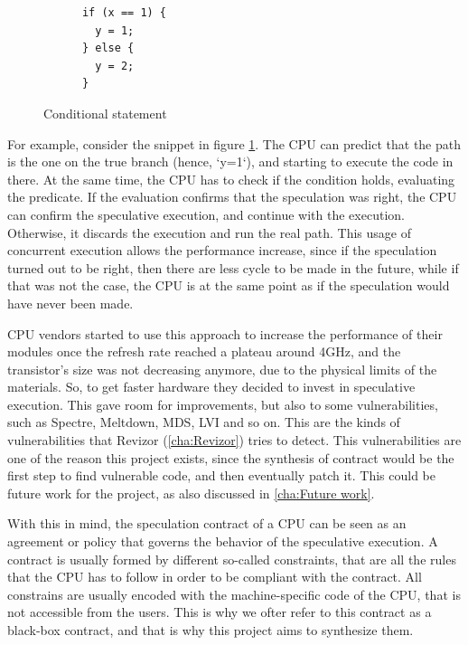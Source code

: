 \begin{figure}
  \centering
  \begin{varwidth}
    {\linewidth} \begin{verbatim}
      if (x == 1) {
        y = 1;
      } else {
        y = 2;
      }
          \end{verbatim}
  \end{varwidth}
  \label{fig:snip1}
  \caption{Conditional statement}
\end{figure}

For example, consider the snippet in figure \ref{fig:snip1}. The CPU can predict
that the path is the one on the true branch (hence, `y=1`), and starting to execute
the code in there. At the same time, the CPU has to check if the condition holds,
evaluating the predicate. If the evaluation confirms that the speculation was right,
the CPU can confirm the speculative execution, and continue with the execution.
Otherwise, it discards the execution and run the real path. This usage of
concurrent execution allows the performance increase, since if the speculation turned
out to be right, then there are less cycle to be made in the future, while if that
was not the case, the CPU is at the same point as if the speculation would have
never been made.

CPU vendors started to use this approach to increase the performance of their
modules once the refresh rate reached a plateau around 4GHz, and the transistor's
size was not decreasing anymore, due to the physical limits of the materials. So,
to get faster hardware they decided to invest in speculative execution. This gave
room for improvements, but also to some vulnerabilities, such as Spectre,
Meltdown, MDS, LVI and so on. This are the kinds of vulnerabilities that Revizor
\cite{article} (\ref{cha:Revizor}) tries to detect. This vulnerabilities are one
of the reason this project exists, since the synthesis of contract would be the first
step to find vulnerable code, and then eventually patch it. This could be future
work for the project, as also discussed in \ref{cha:Future work}.

With this in mind, the speculation contract of a CPU can be seen as an agreement
or policy that governs the behavior of the speculative execution. A contract is
usually formed by different so-called constraints, that are all the rules that the
CPU has to follow in order to be compliant with the contract. All constrains are
usually encoded with the machine-specific code of the CPU, that is not accessible
from the users. This is why we ofter refer to this contract as a black-box
contract, and that is why this project aims to synthesize them.

